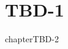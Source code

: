 \documentclass[oneside]{book}
\theoremstyle{definition}
\begin{document}
	\tableofcontents
	
    \chapter{TBD-1}
    \newpage
   	
   
    chapter{TBD-2}
    \newpage
   	

\newpage




\nocite{*}

\end{document}
